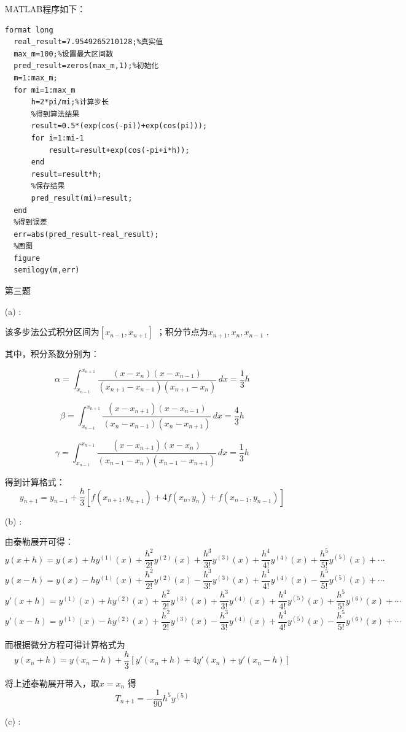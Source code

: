\documentclass[12pt,a4paper,utf8]{ctexart}
\begin{document}
\begin{enumerate}
MATLAB程序如下：
\begin{lstlisting}[frame=single]
  format long
  real_result=7.9549265210128;%真实值
  max_m=100;%设置最大区间数
  pred_result=zeros(max_m,1);%初始化
  m=1:max_m;
  for mi=1:max_m
      h=2*pi/mi;%计算步长
      %得到算法结果
      result=0.5*(exp(cos(-pi))+exp(cos(pi)));
      for i=1:mi-1
          result=result+exp(cos(-pi+i*h));
      end
      result=result*h;
      %保存结果
      pred_result(mi)=result;
  end
  %得到误差
  err=abs(pred_result-real_result);
  %画图
  figure
  semilogy(m,err)
\end{lstlisting}


\item[第三题]

(a) :

该多步法公式积分区间为$ [x_{n-1},x_{n+1}] $ ；积分节点为$ {x_{n+1},x_{n},x_{n-1}} $ .

其中，积分系数分别为：

$$
\alpha = \int_{x_{n-1}}^{x_{n+1}} \frac{(x-x_{n})(x-x_{n-1})}{(x_{n+1}-x_{n-1})(x_{n+1}-x_{n})}  \,dx =\frac{1}{3} h
$$

$$
\beta = \int_{x_{n-1}}^{x_{n+1}} \frac{(x-x_{n+1})(x-x_{n-1})}{(x_{n}-x_{n-1})(x_{n}-x_{n+1})}  \,dx =\frac{4}{3} h
$$

$$
\gamma = \int_{x_{n-1}}^{x_{n+1}} \frac{(x-x_{n+1})(x-x_{n})}{(x_{n-1}-x_{n})(x_{n-1}-x_{n+1})}  \,dx =\frac{1}{3} h
$$

得到计算格式：
$$
y_{n+1}=y_{n-1}+\frac{h}{3} [f(x_{n+1},y_{n+1}) + 4f(x_{n},y_{n}) + f(x_{n-1},y_{n-1})]
$$


(b) :

由泰勒展开可得：
$$
y(x+h)=y(x)+hy^{(1)}(x)+\frac{h^2}{2!} y^{(2)}(x)+\frac{h^3}{3!} y^{(3)}(x)+\frac{h^4}{4!} y^{(4)}(x)+\frac{h^5}{5!} y^{(5)}(x)+\cdots
$$
$$
y(x-h)=y(x)-hy^{(1)}(x)+\frac{h^2}{2!} y^{(2)}(x)-\frac{h^3}{3!} y^{(3)}(x)+\frac{h^4}{4!} y^{(4)}(x)-\frac{h^5}{5!} y^{(5)}(x)+\cdots
$$
$$
y'(x+h)=y^{(1)}(x)+hy^{(2)}(x)+\frac{h^2}{2!} y^{(3)}(x)+\frac{h^3}{3!} y^{(4)}(x)+\frac{h^4}{4!} y^{(5)}(x)+\frac{h^5}{5!} y^{(6)}(x)+\cdots
$$
$$
y'(x-h)=y^{(1)}(x)-hy^{(2)}(x)+\frac{h^2}{2!} y^{(3)}(x)-\frac{h^3}{3!} y^{(4)}(x)+\frac{h^4}{4!} y^{(5)}(x)-\frac{h^5}{5!} y^{(6)}(x)+\cdots
$$

而根据微分方程可得计算格式为
$$
y(x_n+h)=y(x_n-h)+\frac{h}{3} [y'(x_n+h)+4y'(x_n)+y'(x_n-h)]
$$

将上述泰勒展开带入，取$ x=x_n $ 得
$$
T_{n+1}=-\frac{1}{90} h^5y^{(5)}
$$

(c) :


\end{enumerate}
\end{document}

